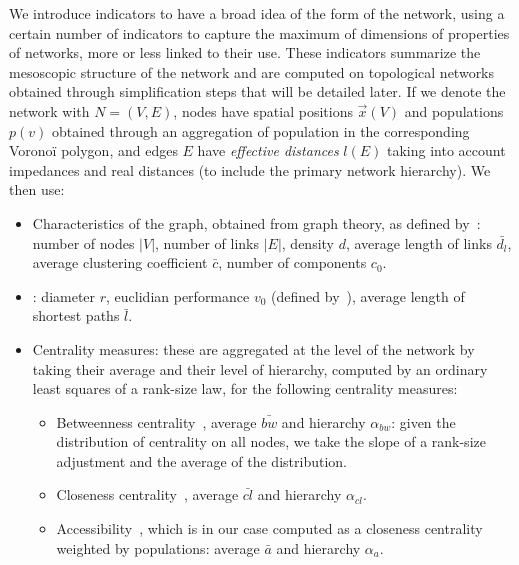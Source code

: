 
We introduce indicators to have a broad idea of the form of the network, using a certain number of indicators to capture the maximum of dimensions of properties of networks, more or less linked to their use. These indicators summarize the mesoscopic structure of the network and are computed on topological networks obtained through simplification steps that will be detailed later. If we denote the network with $N=(V,E)$, nodes have spatial positions $\vec{x}(V)$ and populations $p(v)$ obtained through an aggregation of population in the corresponding Voronoï polygon, and edges $E$ have \emph{effective distances} $l(E)$ taking into account impedances and real distances (to include the primary network hierarchy). We then use:


\begin{itemize}
\item Characteristics of the graph, obtained from graph theory, as defined by~\cite{haggett1970network}: number of nodes $\left|V\right|$, number of links $\left|E\right|$, density $d$, average length of links $\bar{d_l}$, average clustering coefficient $\bar{c}$, number of components $c_0$.
\item {}: diameter $r$, euclidian performance $v_0$ (defined by~\cite{banos2012towards}), average length of shortest paths $\bar{l}$.
\item Centrality measures: these are aggregated at the level of the network by taking their average and their level of hierarchy, computed by an ordinary least squares of a rank-size law, for the following centrality measures:
\begin{itemize}
\item Betweenness centrality~\citep{crucitti2006centrality}, average $\bar{bw}$ and hierarchy $\alpha_{bw}$: given the distribution of centrality on all nodes, we take the slope of a rank-size adjustment and the average of the distribution.
\item Closeness centrality~\citep{crucitti2006centrality}, average $\bar{cl}$ and hierarchy $\alpha_{cl}$.
\item Accessibility~\citep{hansen1959accessibility}, which is in our case computed as a closeness centrality weighted by populations: average $\bar{a}$ and hierarchy $\alpha_{a}$.
\end{itemize}
\end{itemize}

